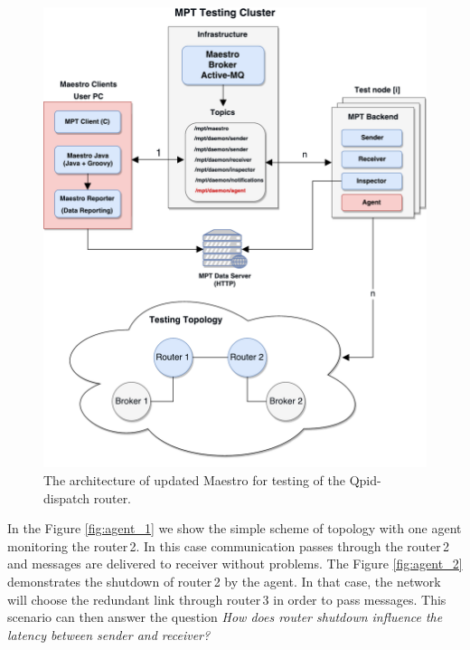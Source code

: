 \begin{figure}[H]
  \centering
  \includegraphics[width=15cm]{obrazky-figures/msg_perf_tool_for_router.pdf}
  \caption{The architecture of updated Maestro for testing of the Qpid-dispatch router.}
  \label{fig:msg_perf_tool_update}
\end{figure}

In the Figure \ref{fig:agent_1} we show the simple scheme of topology with one agent monitoring the router\,2. In this case communication passes through the router\,2 and messages are delivered to receiver without problems. The Figure \ref{fig:agent_2} demonstrates the shutdown of router\,2  by the agent. In that case, the network will choose the redundant link through router\,3 in order to pass messages. This scenario can then answer the question \emph{How does router shutdown influence the latency between sender and receiver?}

